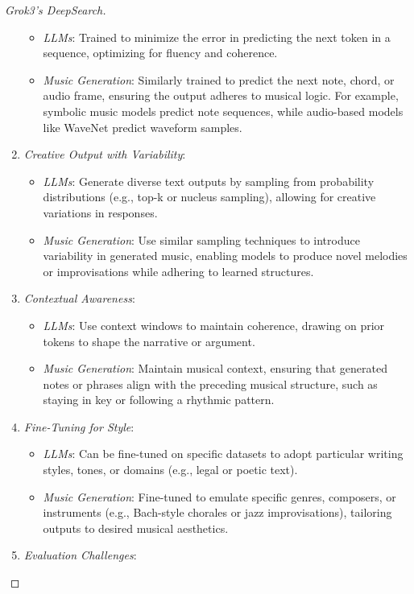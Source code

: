 \documentclass{article}
\begin{document}
\begin{proof}[Grok3's DeepSearch]
\begin{enumerate}
		\begin{itemize}
			\item {\it LLMs}: Trained to minimize the error in predicting the next token in a sequence, optimizing for fluency and coherence.
			\item {\it Music Generation}: Similarly trained to predict the next note, chord, or audio frame, ensuring the output adheres to musical logic. For example, symbolic music models predict note sequences, while audio-based models like WaveNet predict waveform samples.
		\end{itemize}
		\item {\it Creative Output with Variability}:
		\begin{itemize}
			\item {\it LLMs}: Generate diverse text outputs by sampling from probability distributions (e.g., top-k or nucleus sampling), allowing for creative variations in responses.
			\item {\it Music Generation}: Use similar sampling techniques to introduce variability in generated music, enabling models to produce novel melodies or improvisations while adhering to learned structures.
		\end{itemize}
		\item {\it Contextual Awareness}:
		\begin{itemize}
			\item {\it LLMs}: Use context windows to maintain coherence, drawing on prior tokens to shape the narrative or argument.
			\item {\it Music Generation}: Maintain musical context, ensuring that generated notes or phrases align with the preceding musical structure, such as staying in key or following a rhythmic pattern.
		\end{itemize}
		\item {\it Fine-Tuning for Style}:
		\begin{itemize}
			\item {\it LLMs}: Can be fine-tuned on specific datasets to adopt particular writing styles, tones, or domains (e.g., legal or poetic text).
			\item {\it Music Generation}: Fine-tuned to emulate specific genres, composers, or instruments (e.g., Bach-style chorales or jazz improvisations), tailoring outputs to desired musical aesthetics.
		\end{itemize}
		\item {\it Evaluation Challenges}:
		\begin{itemize}

\end{itemize}
\end{enumerate}
\end{proof}
\end{document}
